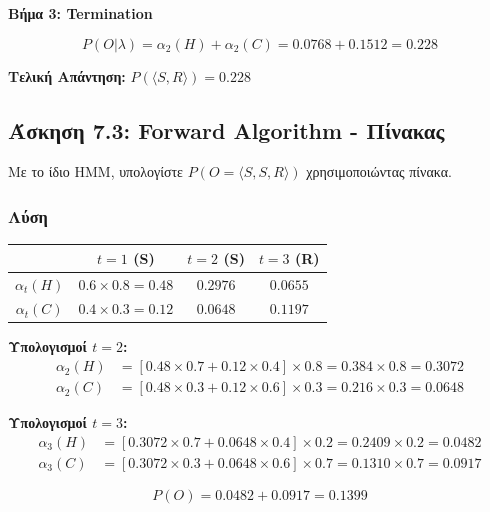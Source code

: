 \textbf{Βήμα 3: Termination}

$$P(O | \lambda) = \alpha_2(H) + \alpha_2(C) = 0.0768 + 0.1512 = 0.228$$

\textbf{Τελική Απάντηση:} $P(\langle S, R \rangle) = 0.228$

\subsection{Άσκηση 7.3: Forward Algorithm - Πίνακας}

\begin{formulabox}[Εκφώνηση]
Με το ίδιο HMM, υπολογίστε $P(O = \langle S, S, R \rangle)$ χρησιμοποιώντας πίνακα.
\end{formulabox}

\subsubsection*{Λύση}

\begin{center}
\begin{tabular}{c|ccc}
\toprule
 & $t=1$ (S) & $t=2$ (S) & $t=3$ (R) \\
\midrule
$\alpha_t(H)$ & $0.6 \times 0.8 = 0.48$ & $0.2976$ & $0.0655$ \\
$\alpha_t(C)$ & $0.4 \times 0.3 = 0.12$ & $0.0648$ & $0.1197$ \\
\bottomrule
\end{tabular}
\end{center}

\textbf{Υπολογισμοί $t=2$:}
\begin{align*}
\alpha_2(H) &= [0.48 \times 0.7 + 0.12 \times 0.4] \times 0.8 = 0.384 \times 0.8 = 0.3072 \\
\alpha_2(C) &= [0.48 \times 0.3 + 0.12 \times 0.6] \times 0.3 = 0.216 \times 0.3 = 0.0648
\end{align*}

\textbf{Υπολογισμοί $t=3$:}
\begin{align*}
\alpha_3(H) &= [0.3072 \times 0.7 + 0.0648 \times 0.4] \times 0.2 = 0.2409 \times 0.2 = 0.0482 \\
\alpha_3(C) &= [0.3072 \times 0.3 + 0.0648 \times 0.6] \times 0.7 = 0.1310 \times 0.7 = 0.0917
\end{align*}

$$P(O) = 0.0482 + 0.0917 = 0.1399$$

